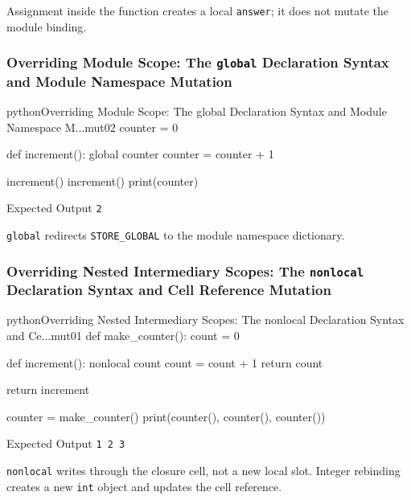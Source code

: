 \documentclass[a4paper,twoside]{report}
\begin{document}
Assignment inside the function creates a local \texttt{answer}; it does not mutate the module binding.

\subsubsection{Overriding Module Scope: The \texttt{global} Declaration Syntax and Module Namespace Mutation}

\begin{codebox}[]{python}{Overriding Module Scope: The global Declaration Syntax and Module Namespace M...}{mut02}
counter = 0

def increment():
    global counter
    counter = counter + 1

increment()
increment()
print(counter)
\end{codebox}


\begin{iobox}{Expected Output}
\texttt{2} \\
\end{iobox}




\texttt{global} redirects \texttt{STORE\_GLOBAL} to the module namespace dictionary.

\subsubsection{Overriding Nested Intermediary Scopes: The \texttt{nonlocal} Declaration Syntax and Cell Reference Mutation}

\begin{codebox}[]{python}{Overriding Nested Intermediary Scopes: The nonlocal Declaration Syntax and Ce...}{mut01}
def make_counter():
    count = 0

    def increment():
        nonlocal count
        count = count + 1
        return count

    return increment

counter = make_counter()
print(counter(), counter(), counter())
\end{codebox}


\begin{iobox}{Expected Output}
\texttt{1 2 3} \\
\end{iobox}




\texttt{nonlocal} writes through the closure cell, not a new local slot. Integer rebinding creates a new \texttt{int} object and updates the cell reference.
\end{document}
